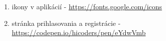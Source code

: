 \begin{enumerate}
    \item ikony v aplikácií - \url{https://fonts.google.com/icons}
    \item stránka prihlasovania a registrácie - \url{https://codepen.io/hicoders/pen/eYdwVmb}
\end{enumerate}